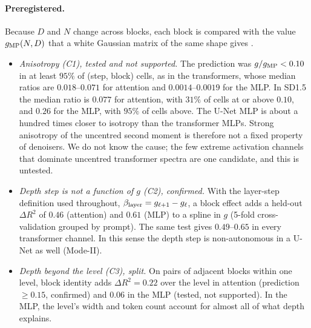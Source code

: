 \documentclass[11pt]{article}
\begin{document}
\paragraph{Preregistered.} Because $D$ and $N$ change across blocks, each block is compared with the value $g_{\rm MP}(N,D)$ that a white Gaussian matrix of the same shape gives \citep{marchenko1967distribution}.
\begin{itemize}
 \item \emph{Anisotropy (C1), tested and not supported.} The prediction was $g/g_{\rm MP}<0.10$ in at least $95\%$ of (step, block) cells, as in the transformers, whose median ratios are $0.018$--$0.071$ for attention and $0.0014$--$0.0019$ for the MLP. In SD1.5 the median ratio is $0.077$ for attention, with $31\%$ of cells at or above $0.10$, and $0.26$ for the MLP, with $95\%$ of cells above. The U-Net MLP is about a hundred times closer to isotropy than the transformer MLPs. Strong anisotropy of the uncentred second moment is therefore not a fixed property of denoisers. We do not know the cause; the few extreme activation channels that dominate uncentred transformer spectra \citep{sun2024massive} are one candidate, and this is untested.
 \item \emph{Depth step is not a function of $g$ (C2), confirmed.} With the layer-step definition used throughout, $\beta_{\rm layer}=g_{\ell+1}-g_\ell$, a block effect adds a held-out $\Delta R^2$ of $0.46$ (attention) and $0.61$ (MLP) to a spline in $g$ (5-fold cross-validation grouped by prompt). The same test gives $0.49$--$0.65$ in every transformer channel. In this sense the depth step is non-autonomous in a U-Net as well (Mode-II).
 \item \emph{Depth beyond the level (C3), split.} On pairs of adjacent blocks within one level, block identity adds $\Delta R^2=0.22$ over the level in attention (prediction $\ge0.15$, confirmed) and $0.06$ in the MLP (tested, not supported). In the MLP, the level's width and token count account for almost all of what depth explains.
\end{itemize}
\end{document}
